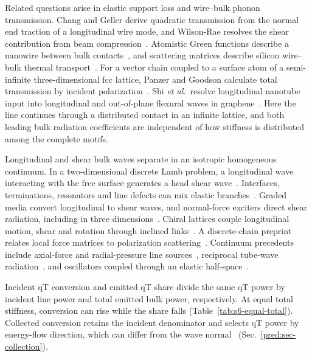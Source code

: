 \documentclass[10pt,aps,onecolumn,floatfix,notitlepage,nofootinbib,showkeys]{revtex4-2}
\begin{document}
Related questions arise in elastic support loss and wire--bulk phonon transmission. Chang and Geller derive quadratic transmission from the normal end traction of a longitudinal wire mode, and Wilson-Rae resolves the shear contribution from beam compression~\cite{ChangGeller2005,WilsonRae2008}. Atomistic Green functions describe a nanowire between bulk contacts~\cite{ZhangMingoFisher2007}, and scattering matrices describe silicon wire--bulk thermal transport~\cite{DucheminDonadio2011}. For a vector chain coupled to a surface atom of a semi-infinite three-dimensional fcc lattice, Panzer and Goodson calculate total transmission by incident polarization~\cite{PanzerGoodson2008,PanzerGoodson2011Erratum}. Shi \textit{et al.}\ resolve longitudinal nanotube input into longitudinal and out-of-plane flexural waves in graphene~\cite{Shi2018}. Here the line continues through a distributed contact in an infinite lattice, and both leading bulk radiation coefficients are independent of how stiffness is distributed among the complete motifs.

Longitudinal and shear bulk waves separate in an isotropic homogeneous continuum. In a two-dimensional discrete Lamb problem, a longitudinal wave interacting with the free surface generates a head shear wave~\cite{Aleksandrova2014}. Interfaces, terminations, resonators and line defects can mix elastic branches~\cite{ZulKarnain2020,Chaplain2020,NievesSharma2024,Clark2025,DalPoggetto2025}. Graded media convert longitudinal to shear waves, and normal-force exciters direct shear radiation, including in three dimensions~\cite{Boddapati2026Graded,Liang2026MetaExcitation,Lu2026ThreeDimensional}. Chiral lattices couple longitudinal motion, shear and rotation through inclined links~\cite{Mangach2024}. A discrete-chain preprint relates local force matrices to polarization scattering~\cite{GonzalezRamirez2026}. Continuum precedents include axial-force and radial-pressure line sources~\cite{Aldridge1998}, reciprocal tube-wave radiation~\cite{Burridge1993}, and oscillators coupled through an elastic half-space~\cite{Pu2021}.

Incident qT conversion and emitted qT share divide the same qT power by incident line power and total emitted bulk power, respectively. At equal total stiffness, conversion can rise while the share falls (Table~\ref{tab:s6-equal-total}). Collected conversion retains the incident denominator and selects qT power by energy-flow direction, which can differ from the wave normal~\cite{Spies1994,Bacigalupo2018} (Sec.~\ref{pred:sec-collection}).
\end{document}

